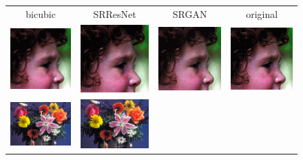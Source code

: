 \documentclass[10pt,twocolumn,letterpaper]{article}
\begin{document}
\begin{figure}[h!]
\begin{tabular}{cccc}
bicubic & SRResNet & SRGAN & original \\
\includegraphics[width=1.5in]{images/used/appendix/jpg/Set14/face_bicubic}&
\includegraphics[width=1.5in]{images/used/appendix/jpg/Set14/face_SRResNet-MSE} &
\includegraphics[width=1.5in]{images/used/appendix/jpg/Set14/face_SRGAN-VGG54} &
\includegraphics[width=1.5in]{images/used/appendix/jpg/Set14/face_HR} \\
\includegraphics[width=1.5in]{images/used/appendix/jpg/Set14/flowers_bicubic}&
\includegraphics[width=1.5in]{images/used/appendix/jpg/Set14/flowers_SRResNet-MSE} &

\end{tabular}
\end{figure}
\end{document}
